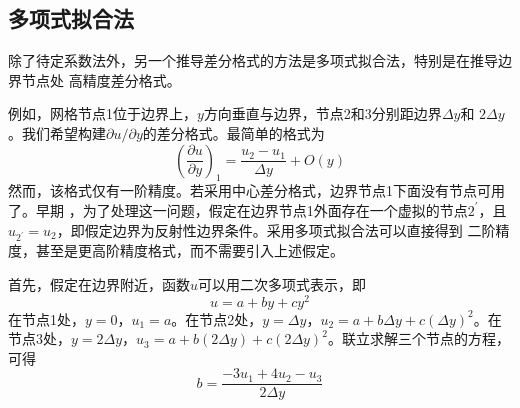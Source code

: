 \subsection{多项式拟合法}
除了待定系数法外，另一个推导差分格式的方法是多项式拟合法，特别是在推导边界节点处
高精度差分格式。

例如，网格节点1位于边界上，$y$方向垂直与边界，节点2和3分别距边界$\Delta y$和
$2\Delta y$。我们希望构建$\partial u/\partial y$的差分格式。最简单的格式为
\begin{equation}
  \left(
  \frac{\partial u}{\partial y}
\right)_{1}
=
\frac{u_{2}-u_{1}}{\Delta y} 
+
O(y)
\end{equation}
然而，该格式仅有一阶精度。若采用中心差分格式，边界节点1下面没有节点可用了。早期
，为了处理这一问题，假定在边界节点1外面存在一个虚拟的节点$2^{\prime}$，且
$u_{2^{\prime}}=u_{2}$，即假定边界为反射性边界条件。采用多项式拟合法可以直接得到
二阶精度，甚至是更高阶精度格式，而不需要引入上述假定。

首先，假定在边界附近，函数$u$可以用二次多项式表示，即
\begin{equation}
  u = a + by + cy^{2}
  \label{EqBD_u_polynomial}
\end{equation}
在节点1处，$y=0$，$u_{1}=a$。在节点2处，$y=\Delta y$，$u_{2}=a + b\Delta y +
c(\Delta y)^{2}$。在节点3处，$y=2\Delta y$，$u_{3} = a + b(2\Delta y)+c(2\Delta
y)^{2}$。联立求解三个节点的方程，可得
\begin{equation}
  b =
  \frac{-3u_{1}+4u_{2}-u_{3}}{2\Delta y}
  \label{EqBD_b}
\end{equation}

